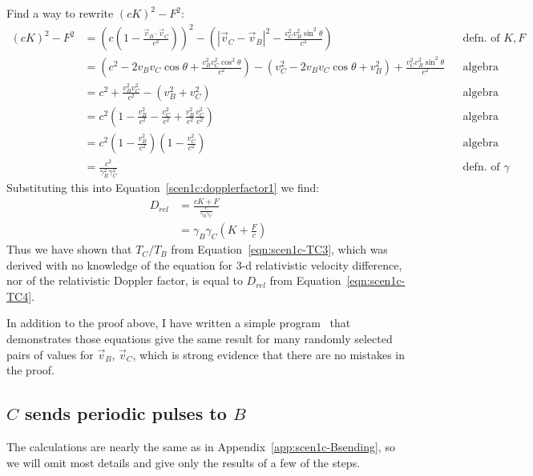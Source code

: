 \documentclass[a4paper]{article}
\theoremstyle{plain}
\theoremstyle{definition}
\newcommand{\vect}[1]{\vec{#1}}
\begin{document}
Find a way to rewrite $(cK)^2-F^2$:
\begin{align}
(cK)^2 - F^2
  & = \left( c (1 - \frac{\vect{v}_B \cdot \vect{v}_C}{c^2}) \right)^2 - \left( |\vect{v}_C - \vect{v}_B|^2 - \frac{v_C^2 v_B^2 \sin^2 \theta}{c^2} \right) & & \text{defn. of $K,F$} \nonumber \\
  & = \left( c^2 - 2 v_B v_C \cos \theta + \frac{v_B^2 v_C^2 \cos^2 \theta}{c^2} \right) - (v_C^2 - 2 v_B v_C \cos \theta + v_B^2) + \frac{v_C^2 v_B^2 \sin^2 \theta}{c^2} & & \text{algebra} \nonumber \\
  & = c^2 + \frac{v_B^2 v_C^2}{c^2} - (v_B^2 + v_C^2) & & \text{algebra} \nonumber \\
  & = c^2 \left( 1 - \frac{v_B^2}{c^2} - \frac{v_C^2}{c^2} + \frac{v_B^2}{c^2} \frac{v_C^2}{c^2} \right) & & \text{algebra} \nonumber \\
  & = c^2 \left( 1 - \frac{v_B^2}{c^2} \right) \left( 1 - \frac{v_C^2}{c^2} \right) & & \text{algebra} \nonumber \\
  & = \frac{c^2}{\gamma_B^2 \gamma_C^2} & & \text{defn. of $\gamma$}
\end{align}
Substituting this into Equation~\eqref{scen1c:dopplerfactor1}
we find:
\begin{align}
D_{rel}
  & = \frac{cK+F}{\frac{c}{\gamma_B \gamma_C}} \nonumber \\
  & = \gamma_B \gamma_C \left( K+\frac{F}{c} \right) \label{eqn:scen1c-TC4}
\end{align}
Thus we have shown that $T_C/T_B$ from
Equation~\eqref{eqn:scen1c-TC3}, which was derived with no knowledge
of the equation for 3-d relativistic velocity difference, nor of the
relativistic Doppler factor, is equal to $D_{rel}$ from
Equation~\eqref{eqn:scen1c-TC4}.

In addition to the proof above, I have written a simple
program~\cite{FingerhutScenario1c-program} that demonstrates those
equations give the same result for many randomly selected pairs of
values for $\vect{v}_B$, $\vect{v}_C$, which is strong
evidence that there are no mistakes in the proof.


\subsection{$C$ sends periodic pulses to $B$}
\label{app:scen1c-Csending}

The calculations are nearly the same as in
Appendix~\ref{app:scen1c-Bsending}, so we will omit most details and
give only the results of a few of the steps.
\end{document}
